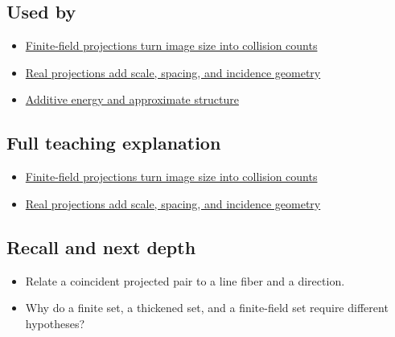 \subsection{Used by}\label{used-by}

\begin{itemize}
\tightlist
\item
  \href{Continuous\%20Notes/University\%20-\%20Worlds,\%20Images\%20and\%20Inference\%20-\%20Graphics,\%20Vision\%20and\%20Photography\#Finite-field\%20projections\%20turn\%20image\%20size\%20into\%20collision\%20counts}{Finite-field projections turn image size into collision counts}
\item
  \href{Continuous\%20Notes/University\%20-\%20Worlds,\%20Images\%20and\%20Inference\%20-\%20Graphics,\%20Vision\%20and\%20Photography\#Real\%20projections\%20add\%20scale,\%20spacing,\%20and\%20incidence\%20geometry}{Real projections add scale, spacing, and incidence geometry}
\item
  \hyperref[appendix-b0732b22e7d6]{Additive energy and approximate structure}
\end{itemize}

\subsection{Full teaching explanation}\label{full-teaching-explanation}

\begin{itemize}
\tightlist
\item
  \href{Continuous\%20Notes/University\%20-\%20Worlds,\%20Images\%20and\%20Inference\%20-\%20Graphics,\%20Vision\%20and\%20Photography\#Finite-field\%20projections\%20turn\%20image\%20size\%20into\%20collision\%20counts}{Finite-field projections turn image size into collision counts}
\item
  \href{Continuous\%20Notes/University\%20-\%20Worlds,\%20Images\%20and\%20Inference\%20-\%20Graphics,\%20Vision\%20and\%20Photography\#Real\%20projections\%20add\%20scale,\%20spacing,\%20and\%20incidence\%20geometry}{Real projections add scale, spacing, and incidence geometry}
\end{itemize}

\subsection{Recall and next depth}\label{recall-and-next-depth}

\begin{itemize}
\tightlist
\item
  Relate a coincident projected pair to a line fiber and a direction.
\item
  Why do a finite set, a thickened set, and a finite-field set require different hypotheses?
\end{itemize}

